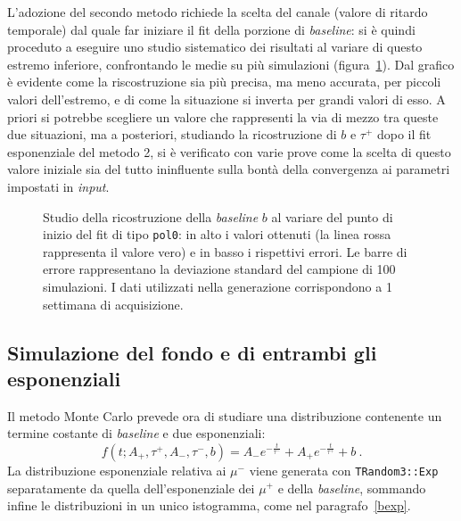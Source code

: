 \documentclass[10pt, oneside, a4paper]{article}   	%
\begin{document}
L'adozione del secondo metodo richiede la scelta del canale (valore di ritardo temporale) dal quale far iniziare il fit della porzione di \textit{baseline}: si è quindi proceduto a eseguire uno studio sistematico dei risultati al variare di questo estremo inferiore, confrontando le medie su più simulazioni (figura~\ref{baselinestart}). Dal grafico è evidente come la riscostruzione sia più precisa, ma meno accurata, per piccoli valori dell'estremo, e di come la situazione si inverta per grandi valori di esso. A priori si potrebbe scegliere un valore che rappresenti la via di mezzo tra queste due situazioni, ma a posteriori, studiando la ricostruzione di $b$ e $\tau^+$ dopo il fit esponenziale del metodo 2, si è verificato con varie prove come la scelta di questo valore iniziale sia del tutto ininfluente sulla bontà della convergenza ai parametri impostati in \textit{input}.
%
\begin{figure}[h]
  \centerline{}
  \caption{Studio della ricostruzione della \textit{baseline} $b$ al variare del punto di inizio del fit di tipo \texttt{pol0}: in alto i valori ottenuti (la linea rossa rappresenta il valore vero) e in basso i rispettivi errori. Le barre di errore rappresentano la deviazione standard del campione di 100 simulazioni. I dati utilizzati nella generazione corrispondono a 1 settimana di acquisizione.}\label{baselinestart}
\end{figure}
%
\subsection{Simulazione del fondo e di entrambi gli esponenziali}
Il metodo Monte Carlo prevede ora di studiare una distribuzione contenente un termine costante di \textit{baseline} e due esponenziali:
\begin{equation}
 f(t;A_+,\tau^+,A_-,\tau^-, b)=A_-e^{-\frac{t}{\tau^-}}+A_+e^{-\frac{t}{\tau^+}}+b\ .
 \label{eq::funzione_fit_finale}
\end{equation}
La distribuzione esponenziale relativa ai $\mu^-$ viene generata con \lstinline{TRandom3::Exp} separatamente da quella dell'esponenziale dei $\mu^+$ e della \textit{baseline}, sommando infine le distribuzioni in un unico istogramma, come nel paragrafo~\cref{bexp}. 
\end{document}
